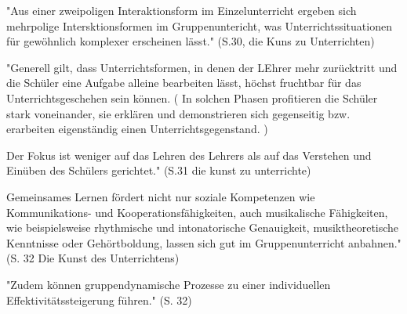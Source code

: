 







"Aus einer zweipoligen Interaktionsform im Einzelunterricht ergeben sich
mehrpolige Intersktionsformen im Gruppenuntericht, was Unterrichtssituationen
für gewöhnlich komplexer erscheinen lässt." (S.30, die Kuns zu Unterrichten)


"Generell gilt, dass Unterrichtsformen, in denen der LEhrer mehr zurücktritt und
die Schüler eine Aufgabe alleine bearbeiten lässt, höchst fruchtbar für das
Unterrichtsgeschehen sein können. ( In solchen Phasen profitieren die Schüler
stark voneinander, sie erklären und demonstrieren sich gegenseitig bzw.
erarbeiten eigenständig einen Unterrichtsgegenstand. ) 

Der Fokus ist weniger auf
das Lehren des Lehrers als auf das Verstehen und Einüben des Schülers
gerichtet."  (S.31 die kunst zu unterrichte)


Gemeinsames Lernen fördert nicht nur soziale Kompetenzen wie Kommunikations- und
Kooperationsfähigkeiten, auch musikalische Fähigkeiten, wie beispielsweise
rhythmische und intonatorische Genauigkeit, musiktheoretische Kenntnisse oder
Gehörtboldung, lassen sich gut im Gruppenunterricht anbahnen." (S. 32 Die Kunst
des Unterrichtens)

"Zudem können gruppendynamische Prozesse zu einer individuellen
Effektivitätssteigerung führen." (S. 32)
